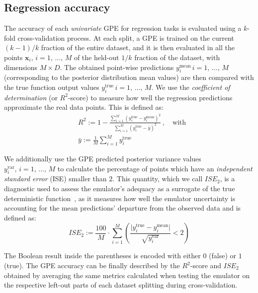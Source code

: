 \subsection{Regression accuracy}\label{sec:ch3regressionaccuracy}
The accuracy of each \textit{univariate} GPE for regression tasks is evaluated using a $k$-fold cross-validation process. At each split, a GPE is trained on the current $(k-1)/k$ fraction of the entire dataset, and it is then evaluated in all the points $\mathbf{x}_i,\,i=1,\,\dots,\,M$ of the held-out $1/k$ fraction of the dataset, with dimensions $M\times D$. The obtained point-wise predictions $y_{i}^{\textrm{mean}}\,i=1,\,\dots,\,M$ (corresponding to the posterior distribution mean values) are then compared with the true function output values $y_{i}^{\textrm{true}}\,i=1,\,\dots,\,M$. We use the \textit{coefficient of determination} (or $R^2$-score) to measure how well the regression predictions approximate the real data points. This is defined as:
%
\begin{align}
    & R^2 := 1 - \frac{\sum_{i=1}^M(y_{i}^{\textrm{true}}-y_{i}^{\textrm{mean}})^2}{\sum_{i=1}^M(y_{i}^{\textrm{true}} - \bar{y})^2}\,,\quad\text{with} \\
    & \bar{y}:=\frac{1}{M}\sum_{i=1}^M y_{i}^{\textrm{true}}
\end{align}

\noindent
We additionally use the GPE predicted posterior variance values $y_{i}^{\textrm{var}},\,i=1,\,\dots,\,M$ to calculate the percentage of points which have an \textit{independent standard error} (\acs{ISE}) smaller than $2$. This quantity, which we call $ISE_2$, is a diagnostic used to assess the emulator's adequacy as a surrogate of the true deterministic function~\cite{Bastos:2009}, as it measures how well the emulator uncertainty is accounting for the mean predictions' departure from the observed data and is defined as:
%
\begin{equation}
    ISE_2 := \frac{100}{M}\cdot \sum_{i=1}^M\left(\frac{\vert y_{i}^{\textrm{true}}-y_{i}^{\textrm{mean}}\vert}{\sqrt{y_{i}^{\textrm{var}}}} < 2\right)
\end{equation}

\noindent
The Boolean result inside the parentheses is encoded with either $0$ (false) or $1$ (true). The GPE accuracy can be finally described by the $R^2$-score and $ISE_2$ obtained by averaging the same metrics calculated when testing the emulator on the respective left-out parts of each dataset splitting during cross-validation.

